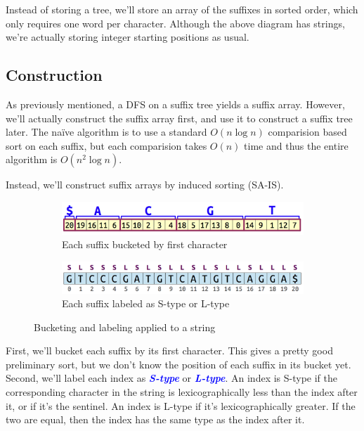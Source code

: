 \documentclass[11pt, oneside]{article}
\newcommand{\emphasis}[1]{\textcolor{blue}{\textbf{\textit{#1}}}}
\begin{document}
Instead of storing a tree, we'll store an array of the suffixes in sorted order,
which only requires one word per character. Although the above diagram has strings,
we're actually storing integer starting positions as usual.

\subsection{Construction}

As previously mentioned, a DFS on a suffix tree yields a suffix array.
However, we'll actually construct the suffix array first, and use it to construct a
suffix tree later. The naïve algorithm is to use a standard \( O(n \log n) \) comparision based
sort on each suffix, but each comparision takes \( O(n) \) time and thus the entire algorithm
is \( O(n^2 \log n) \).

Instead, we'll construct suffix arrays by induced sorting (SA-IS).

\begin{figure}[h!]
    \centering
    \begin{subfigure}[h]{\textwidth}
      \centering
      \includegraphics[scale=0.4]{bucket}
      \caption{Each suffix bucketed by first character}
    \end{subfigure}
    \newline
    \begin{subfigure}[h]{\textwidth}
      \centering
      \includegraphics[scale=0.4]{label}
      \caption{Each suffix labeled as S-type or L-type}
    \end{subfigure}
    \caption{Bucketing and labeling applied to a string}
\end{figure}

First, we'll bucket each suffix by its first character.
This gives a pretty good preliminary sort, but we don't know the position of each
suffix in its bucket yet. Second, we'll label each index as \emphasis{S-type} or \emphasis{L-type}.
An index is S-type if the corresponding character in the string is lexicographically less than the index after it, or if it's the sentinel. An index is L-type if it's lexicographically greater. If the two are equal, then the index has the same type as the index after it.
\end{document}
